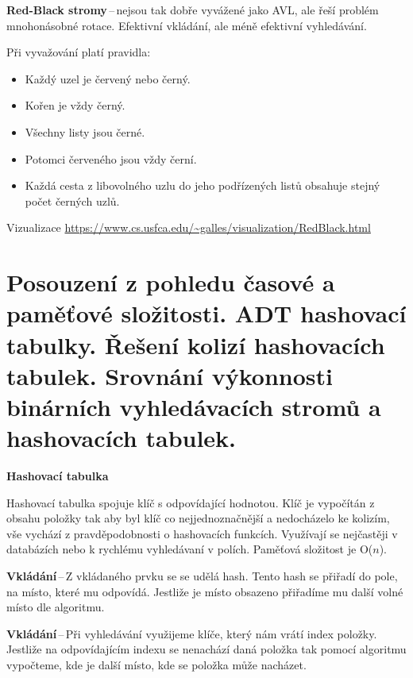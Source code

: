 \vspace{0,5cm}

\textbf{Red-Black stromy}\,--\,nejsou tak dobře vyvážené jako AVL, ale řeší problém mnohonásobné rotace. Efektivní vkládání, ale méně efektivní vyhledávání.

Při vyvažování platí pravidla:
\begin{itemize}
    \item Každý uzel je červený nebo černý.
    \item Kořen je vždy černý.
    \item Všechny listy jsou černé.
    \item Potomci červeného jsou vždy černí.
    \item Každá cesta z libovolného uzlu do jeho podřízených listů obsahuje stejný počet černých uzlů.
\end{itemize}
Vizualizace \url{https://www.cs.usfca.edu/~galles/visualization/RedBlack.html}








\section{Posouzení z pohledu časové a paměťové složitosti. ADT hashovací tabulky. Řešení kolizí hashovacích tabulek. Srovnání výkonnosti binárních vyhledávacích stromů a hashovacích tabulek.}


\begin{Large}\vspace{0,2cm} \textbf{Hashovací tabulka}
\end{Large}

Hashovací tabulka spojuje klíč s odpovídající hodnotou. Klíč je vypočítán z obsahu položky tak aby byl klíč co nejjednoznačnější a nedocházelo ke kolizím, vše vychází z pravděpodobnosti o hashovacích funkcích. Využívají se nejčastěji v databázích nebo k rychlému vyhledávaní v polích. Paměťová složitost je O($n$).

\textbf{Vkládání}\,--\,Z vkládaného prvku se se udělá hash. Tento hash se přiřadí do pole, na místo, které mu odpovídá. Jestliže je místo obsazeno přiřadíme mu další volné místo dle algoritmu.

\textbf{Vkládání}\,--\,Při vyhledávání využijeme klíče, který nám vrátí index položky. Jestliže na odpovídajícím indexu se nenachází daná položka tak pomocí algoritmu vypočteme, kde je další místo, kde se položka může nacházet.

